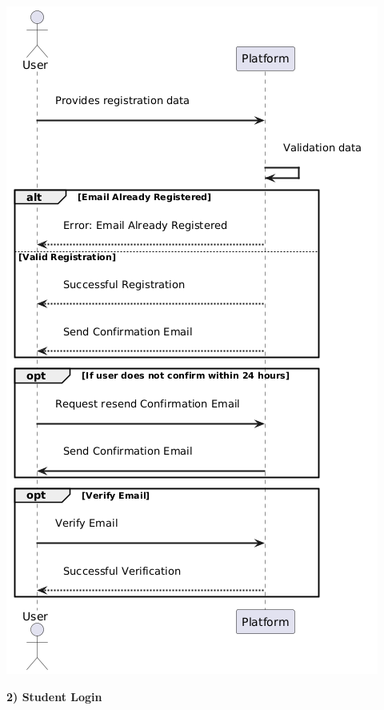 \begin{center}
    \includegraphics[scale = 0.5]{Images/ImagesRASD/user_registration.png}
\end{center}
\newpage
\textbf{2) Student Login}\\

